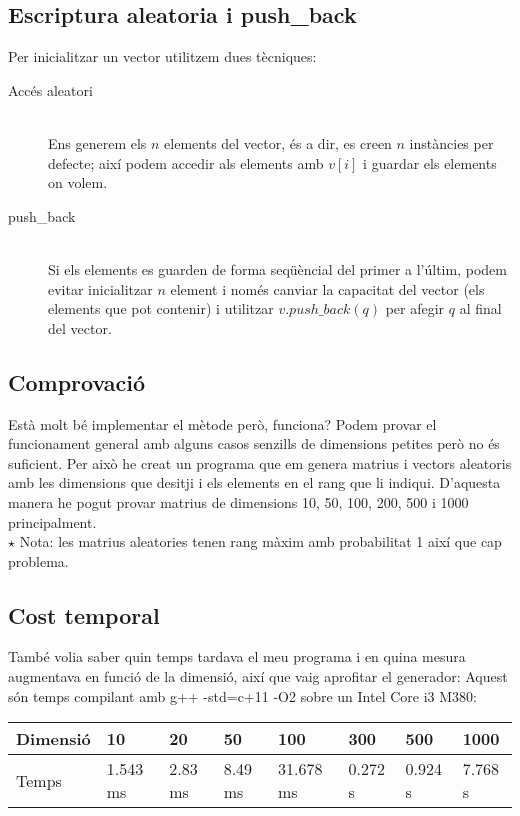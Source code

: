 \documentclass[a4paper,10pt]{article}
\begin{document}
\subsection{Escriptura aleatoria i push\_back}
Per inicialitzar un vector utilitzem dues tècniques:
\begin{description}
 \item[Accés aleatori] \hfill \\
 Ens generem els $n$ elements del vector, és a dir, es creen $n$ instàncies per defecte; així podem accedir als elements amb $v[i]$ i guardar els elements
 on volem.
 \item[push\_back] \hfill \\
 Si els elements es guarden de forma seqüèncial del primer a l'últim, podem evitar inicialitzar $n$ element i només canviar la capacitat del vector
 (els elements que pot contenir) i utilitzar $v.push\_back(q)$ per afegir $q$ al final del vector.
\end{description}
\subsection{Comprovació}
Està molt bé implementar el mètode però, funciona? Podem provar el funcionament general amb alguns casos senzills de dimensions petites però no és suficient.
Per això he creat un programa que em genera matrius i vectors aleatoris amb les dimensions que desitji i els elements en el rang que li indiqui.
D'aquesta manera he pogut provar matrius de dimensions 10, 50, 100, 200, 500 i 1000 principalment. \\
$\star$ Nota: les matrius aleatories tenen rang màxim amb probabilitat 1 així que cap problema.
\subsection{Cost temporal}
També volia saber quin temps tardava el meu programa i en quina mesura augmentava en funció de la dimensió, així que vaig aprofitar el generador:
Aquest són temps compilant amb g++ -std=c+11 -O2 sobre un Intel Core i3 M380:
\begin{table}[h]
\begin{tabular}{|l|l|l|l|l|l|l|l|}
\hline
Dimensió & 10       & 20      & 50      & 100       & 300     & 500     & 1000    \\ \hline
Temps    & 1.543 ms & 2.83 ms & 8.49 ms & 31.678 ms & 0.272 s & 0.924 s & 7.768 s \\ \hline
\end{tabular}
\end{table}
\end{document}
